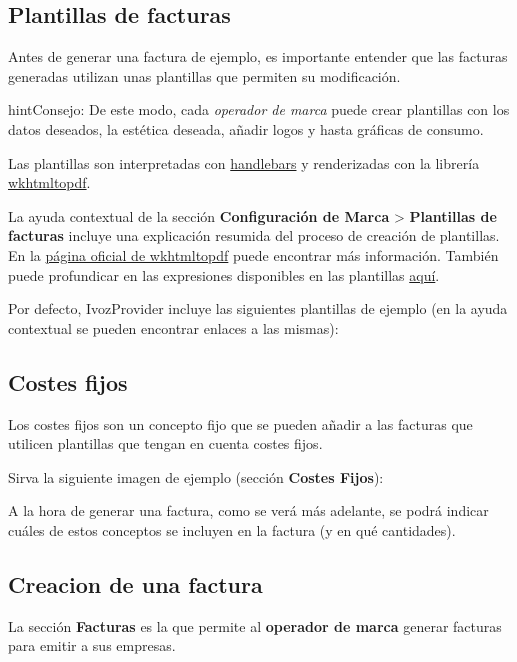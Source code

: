 \documentclass[letterpaper,10pt,spanish]{sphinxmanual}
\begin{document}
\subsection{Plantillas de facturas}
\label{billing_and_invoices/invoices:invoice-templates}
Antes de generar una factura de ejemplo, es importante entender que las facturas generadas utilizan unas plantillas que permiten su modificación.

\begin{notice}{hint}{Consejo:}
De este modo, cada \emph{operador de marca} puede crear plantillas con los datos deseados, la estética deseada, añadir logos y hasta gráficas de consumo.
\end{notice}

Las plantillas son interpretadas con \href{https://github.com/XaminProject/handlebars.php}{handlebars} y renderizadas con la librería \href{https://wkhtmltopdf.org/}{wkhtmltopdf}.

La ayuda contextual de la sección \textbf{Configuración de Marca} \textgreater{} \textbf{Plantillas de facturas} incluye una explicación resumida del proceso de creación de plantillas. En la \href{https://wkhtmltopdf.org/usage/wkhtmltopdf.txt}{página oficial de wkhtmltopdf} puede encontrar más información. También puede profundicar en las expresiones disponibles en las plantillas \href{http://handlebarsjs.com/expressions.html}{aquí}.

Por defecto, IvozProvider incluye las siguientes plantillas de ejemplo (en la ayuda contextual se pueden encontrar enlaces a las mismas):

\noindent{}


\subsection{Costes fijos}
\label{billing_and_invoices/invoices:fixed-costs}
Los costes fijos son un concepto fijo que se pueden añadir a las facturas que utilicen plantillas que tengan en cuenta costes fijos.

Sirva la siguiente imagen de ejemplo (sección \textbf{Costes Fijos}):

\noindent{}

A la hora de generar una factura, como se verá más adelante, se podrá indicar cuáles de estos conceptos se incluyen en la factura (y en qué cantidades).


\subsection{Creacion de una factura}
\label{billing_and_invoices/invoices:invoice-creation}
La sección \textbf{Facturas} es la que permite al \textbf{operador de marca} generar facturas para emitir a sus empresas.
\end{document}

